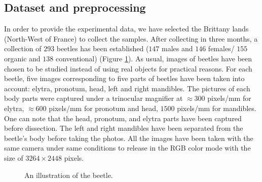 \documentclass[review]{elsarticle}
\begin{document}
\subsection{Dataset and preprocessing}
\label{subsec21}
In order to provide the experimental data, we have selected the Brittany lands (North-West of France) to collect the samples. After collecting in three months, a collection of $293$ beetles has been established ($147$ males and $146$ females/ $155$ organic and $138$ conventional) (Figure \ref{imgbeetle}). As usual, images of beetles have been chosen to be studied instead of using real objects for practical reasons. For each beetle, five images corresponding to five parts of beetles have been taken into account: elytra, pronotum, head, left and right mandibles. The pictures of each body parts were captured under a trinocular magnifier at $\approx 300$ pixels/mm for elytra, $\approx 600$ pixels/mm for pronotum and head, $1500$ pixels/mm for mandibles. One can note that the head, pronotum, and elytra parts have been captured before dissection. The left and right mandibles have been separated from the beetle's body before taking the photos. All the images have been taken with the same camera under same conditions to release in the RGB color mode with the size of $3264 \times 2448$ pixels.

\begin{figure}[h!]
	\centering
	\caption{An illustration of the beetle.}
	\label{imgbeetle}
\end{figure}
\end{document}
